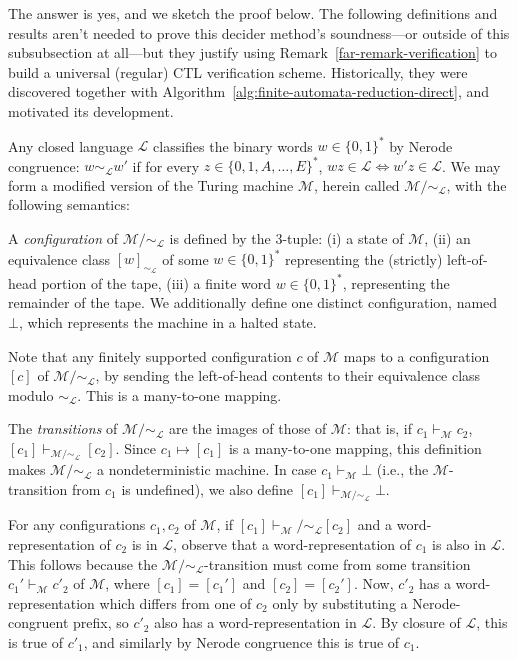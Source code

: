 The answer is yes, and we sketch the proof below.
The following definitions and results aren't needed to prove this decider method's soundness---or outside of this subsubsection at all---but they justify using Remark~\ref{far-remark-verification} to build a universal (regular) CTL verification scheme.
Historically, they were discovered together with Algorithm~\ref{alg:finite-automata-reduction-direct}, and motivated its development.

Any closed language $\mathcal{L}$ classifies the binary words $w\in\{0,1\}^*$ by Nerode congruence: $w\sim_\mathcal{L} w'$ if for every $z\in\{0,1,A,\ldots,E\}^*$, $wz\in\mathcal{L}\iff w'z\in\mathcal{L}$.
We may form a modified version of the Turing machine $\mathcal{M}$, herein called $\mathcal{M}/\sim_\mathcal{L}$, with the following semantics:

A \textit{configuration} of $\mathcal{M}/\sim_\mathcal{L}$ is defined by the 3-tuple: (i) a state of $\mathcal{M}$, (ii) an equivalence class $[w]_{\sim_\mathcal{L}}$ of some $w\in\{0,1\}^*$ representing the (strictly) left-of-head portion of the tape,  (iii) a finite word $w\in\{0,1\}^*$, representing the remainder of the tape.
We additionally define one distinct configuration, named $\bot$, which represents the machine in a halted state.

Note that any finitely supported configuration $c$ of $\mathcal{M}$ maps to a configuration $[c]$ of $\mathcal{M}/\sim_{\mathcal{L}}$, by sending the left-of-head contents to their equivalence class modulo $\sim_\mathcal{L}$.
This is a many-to-one mapping.

The \emph{transitions} of $\mathcal{M}/\sim_{\mathcal{L}}$ are the images of those of $\mathcal{M}$: that is, if $c_1\vdash_\mathcal{M} c_2$, $[c_1]\vdash_{\mathcal{M}/\sim_\mathcal{L}} [c_2]$. Since $c_1\mapsto[c_1]$ is a many-to-one mapping, this definition makes $\mathcal{M}/\sim_\mathcal{L}$ a nondeterministic machine.
In case $c_1\vdash_\mathcal{M}\bot$ (i.e., the $\mathcal{M}$-transition from $c_1$ is undefined), we also define $[c_1]\vdash_{\mathcal{M}/\sim_\mathcal{L}}\bot$.

For any configurations $c_1,c_2$ of $\mathcal{M}$, if $[c_1]\vdash_\mathcal{M}/\sim_\mathcal{L} [c_2]$ and a word-representation of $c_2$ is in $\mathcal{L}$, observe that a word-representation of $c_1$ is also in $\mathcal{L}$.
This follows because the $\mathcal{M}/\sim_\mathcal{L}$-transition must come from some transition $c_1'\vdash_\mathcal{M}c'_2$ of $\mathcal{M}$, where $[c_1]=[c_1']$ and $[c_2]=[c_2']$. Now, $c'_2$ has a word-representation which differs from one of $c_2$ only by substituting a Nerode-congruent prefix, so $c'_2$ also has a word-representation in $\mathcal{L}$. By closure of $\mathcal{L}$, this is true of $c'_1$, and similarly by Nerode congruence this is true of $c_1$.

